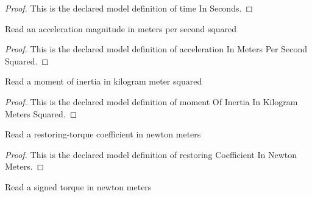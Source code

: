 \begin{proof}
  This is the declared model definition of time In Seconds.
\end{proof}
\begin{definition}
  \label{def:physics:phyx-mini-0262:phyxminiproblems-problemphyxmini0262-accelerationinmeterspersecondsquared}
  Read an acceleration magnitude in meters per second squared
\end{definition}
\begin{proof}
  This is the declared model definition of acceleration In Meters Per Second Squared.
\end{proof}
\begin{definition}
  \label{def:physics:phyx-mini-0262:phyxminiproblems-problemphyxmini0262-momentofinertiainkilogrammeterssquared}
  Read a moment of inertia in kilogram meter squared
\end{definition}
\begin{proof}
  This is the declared model definition of moment Of Inertia In Kilogram Meters Squared.
\end{proof}
\begin{definition}
  \label{def:physics:phyx-mini-0262:phyxminiproblems-problemphyxmini0262-restoringcoefficientinnewtonmeters}
  Read a restoring-torque coefficient in newton meters
\end{definition}
\begin{proof}
  This is the declared model definition of restoring Coefficient In Newton Meters.
\end{proof}
\begin{definition}
  \label{def:physics:phyx-mini-0262:phyxminiproblems-problemphyxmini0262-torqueinnewtonmeters}
  Read a signed torque in newton meters
\end{definition}
